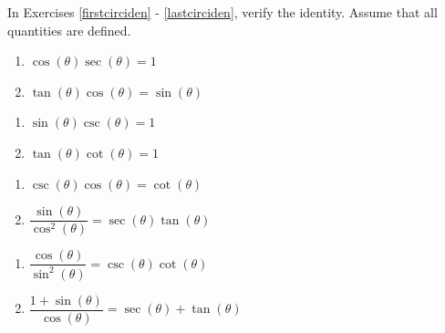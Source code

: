 In Exercises \ref{firstcirciden} - \ref{lastcirciden}, verify the identity.  Assume that all quantities are defined.

\begin{multicols}{2}

\begin{enumerate}

\setcounter{enumi}{\value{HW}}

\item $\cos(\theta) \sec(\theta) = 1$ \label{firstcirciden}
\item $\tan(\theta)\cos(\theta) = \sin(\theta)$

\setcounter{HW}{\value{enumi}}

\end{enumerate}

\end{multicols}

\begin{multicols}{2}

\begin{enumerate}

\setcounter{enumi}{\value{HW}}

\item $\sin(\theta) \csc(\theta) = 1$
\item $\tan(\theta) \cot(\theta) = 1$

\setcounter{HW}{\value{enumi}}

\end{enumerate}

\end{multicols}

\begin{multicols}{2}

\begin{enumerate}

\setcounter{enumi}{\value{HW}}

\item $\csc(\theta) \cos(\theta) = \cot(\theta)$ 
\item $\dfrac{\sin(\theta)}{\cos^{2}(\theta)} = \sec(\theta) \tan(\theta)$

\setcounter{HW}{\value{enumi}}

\end{enumerate}

\end{multicols}

\begin{multicols}{2}

\begin{enumerate}

\setcounter{enumi}{\value{HW}}

\item $\dfrac{\cos(\theta)}{\sin^{2}(\theta)} = \csc(\theta) \cot(\theta)$
\item $\dfrac{1+ \sin(\theta)}{\cos(\theta)} = \sec(\theta) + \tan(\theta)$

\setcounter{HW}{\value{enumi}}

\end{enumerate}

\end{multicols}

